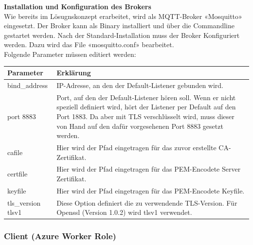\textbf{Installation und Konfiguration des Brokers} \\
Wie bereits im Lösugnskonzept erarbeitet, wird als MQTT-Broker «Mosquitto» eingesetzt. Der Broker kann als Binary installiert und über die Commandline gestartet werden.
Nach der Standard-Installation muss der Broker Konfiguriert werden. Dazu wird das File «mosquitto.conf» bearbeitet.
\\Folgende Parameter müssen editiert werden:

\begin{tabularx}{\textwidth}{lX}
		\textbf{Parameter} & \textbf{Erklärung}
		\\ \hline
			bind\_address \tbd &
			IP-Adresse, an den der Default-Listener gebunden wird.
		\\ \hline
			port 8883 &
			Port, auf den der Default-Listener hören soll. Wenn er nicht speziell definiert wird, hört der Listener per Default auf den Port 1883. Da aber mit TLS verschlüsselt wird, muss dieser von Hand auf den dafür vorgesehenen Port 8883 gesetzt werden.
		\\ \hline
			cafile \tbd &
			Hier wird der Pfad eingetragen für das zuvor erstellte CA-Zertifikat.
		\\ \hline
			certfile \tbd &
			Hier wird der Pfad eingetragen für das PEM-Encodete Server Zertifikat.
		\\ \hline
			keyfile \tbd &
			Hier wird der Pfad eingetragen für das PEM-Encodete Keyfile.
		\\ \hline
			tls\_version tlsv1 &
			Diese Option definiert die zu verwendende TLS-Version. Für Openssl (Version 1.0.2) wird tlsv1 verwendet.
		\\ \hline
\end{tabularx}

\subsubsection{Client (Azure Worker Role)}






